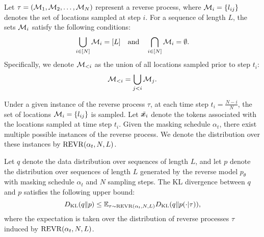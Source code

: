 \begin{definition}
\label{def:ins_rev}
    Let $\tau = ({\mathcal{M}}_1, {\mathcal{M}}_2, \dots, {\mathcal{M}}_N)$ represent a reverse process, where ${\mathcal{M}}_i = \{l_{ij}\}$ denotes the set of locations sampled at step $i$. For a sequence of length $L$, the sets ${\mathcal{M}}_i$ satisfy the following conditions:
    \[
    \bigcup_{i \in [N]} {\mathcal{M}}_i = [L] \quad \text{and} \quad \bigcap_{i \in [N]} {\mathcal{M}}_i = \emptyset.
    \]
    Specifically, we denote ${\mathcal{M}}_{<i}$ as the union of all locations sampled prior to step $t_i$:
    $${\mathcal{M}}_{<i}=\bigcup_{j<i} {\mathcal{M}}_j.$$
\end{definition}

Under a given instance of the reverse process $\tau$, at each time step $t_i = \frac{N-i}{N}$, the set of locations ${\mathcal{M}}_i = \{l_{ij}\}$ is sampled. Let $\Tilde{{\bm{x}}_i}$ denote the tokens associated with the locations sampled at time step $t_i$. Given the masking schedule $\alpha_t$, there exist multiple possible instances of the reverse process. We denote the distribution over these instances by $\operatorname{REVR}(\alpha_t, N, L)$.

\begin{lemma}
\label{lemma:kl_upper_mask}
    Let $q$ denote the data distribution over sequences of length $L$, and let $p$ denote the distribution over sequences of length $L$ generated by the reverse model $p_\theta$ with masking schedule $\alpha_t$ and $N$ sampling steps. The KL divergence between $q$ and $p$ satisfies the following upper bound:
    \[
    D_{\mathrm{KL}}(q\|p) \leq \mathbb{E}_{\tau \sim \operatorname{REVR}(\alpha_t, N, L)} D_{\mathrm{KL}}(q\|p(\cdot | \tau)),
    \]
    where the expectation is taken over the distribution of reverse processes $\tau$ induced by $\operatorname{REVR}(\alpha_t, N, L)$.
\end{lemma}

